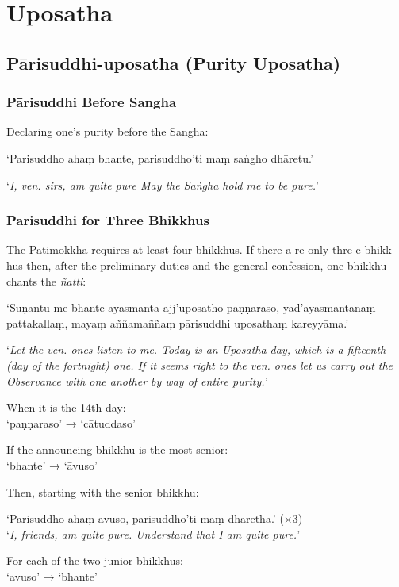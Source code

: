 \chapter{Uposatha}

\section{Pārisuddhi-uposatha (Purity Uposatha)}

\subsection{Pārisuddhi Before Sangha}

Declaring one's purity before the Sangha:

‘Parisuddho ahaṃ bhante, parisuddho'ti maṃ saṅgho dhāretu.’

‘\emph{I, ven. sirs, am quite pure May the Saṅgha hold me to be pure.}’


\subsection{Pārisuddhi for Three Bhikkhus}

The Pātimokkha requires at least four bhikkhus. If there a re only thre e bhikk
hus then, after the preliminary duties and the general confession, one bhikkhu
chants the \emph{ñatti}:

‘Suṇantu me bhante āyasmantā ajj'uposatho paṇṇaraso, yad'āyasmantānaṃ
pattakallaṃ, mayaṃ aññamaññaṃ pārisuddhi uposathaṃ kareyyāma.’

‘\emph{Let the ven. ones listen to me. Today is an Uposatha day, which is a
  fifteenth (day of the fortnight) one. If it seems right to the ven. ones let
  us carry out the Observance with one another by way of entire purity.}’

When it is the 14th day:\\
‘paṇṇaraso’ → ‘cātuddaso’

If the announcing bhikkhu is the most senior:\\
‘bhante’ → ‘āvuso’

Then, starting with the senior bhikkhu:

‘Parisuddho ahaṃ āvuso, parisuddho'ti maṃ dhāretha.’ (×3)\\
‘\emph{I, friends, am quite pure. Understand that I am quite pure.}’

For each of the two junior bhikkhus:\\
‘āvuso’ → ‘bhante’

